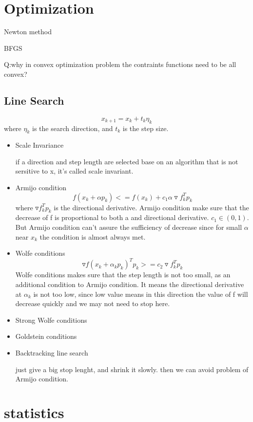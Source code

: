 \documentclass[10pt,a4paper]{book}
\begin{document}
\chapter{Optimization}
 Newton method
 
 BFGS
 
 Q:why in convex optimization problem the contraints functions need to be all convex?
\section {Line Search}

$$x_{k+1} = x_k + t_k \eta_k$$
where $\eta_k$ is the search direction, and $t_k$ is the step size.

\begin{itemize}
\item Scale Invariance

if a direction and step length are selected base on an algorithm that is not sersitive to x, it's called scale invariant.

\item Armijo condition
$$ f(x_k+\alpha p_k) <= f(x_k) + c_1 \alpha \triangledown f_k^T p_k $$
where $ \triangledown f_k^T p_k $ is the directional derivative. Armijo condition make sure that the decrease of f is proportional to both a and directional derivative. $c_1 \in (0, 1)$. But Armijo condition can't assure the sufficiency of decrease since for small $\alpha$ near $x_k$ the condition is almost always met.

\item Wolfe conditions
$$ \triangledown f(x_k+\alpha_k p_k)^T p_k >= c_2 \triangledown f_k^Tp_k $$
Wolfe conditions makes sure that the step length is not too small, as an additional condition to Armijo condition. It means the directional derivative at $\alpha_k$ is not too low, since low value means in this direction the value of f will decrease quickly and we may not need to stop here.

\item Strong Wolfe conditions

\item Goldstein conditions

\item Backtracking line search

just give a big stop lenght, and shrink it slowly. then we can avoid problem of Armijo condition.

\end{itemize}

\chapter{statistics}
\end{document}
